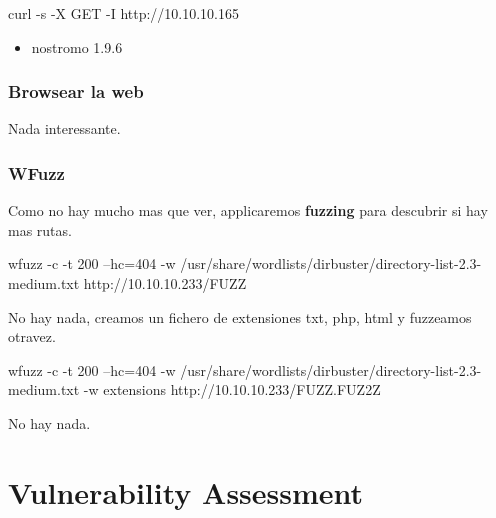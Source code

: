 \documentclass{assets/ipesethesis}
\newenvironment{Shaded}{\begin{snugshade}}{\end{snugshade}}
\newcommand{\ExtensionTok}[1]{#1}
\newcommand{\NormalTok}[1]{#1}
\providecommand{\tightlist}{%
  \setlength{\itemsep}{0pt}\setlength{\parskip}{0pt}}
\begin{document}
\begin{Shaded}
\begin{Highlighting}[]
\ExtensionTok{curl}\NormalTok{ -s -X GET -I http://10.10.10.165}
\end{Highlighting}
\end{Shaded}

\begin{itemize}
\tightlist
\item
  nostromo 1.9.6
\end{itemize}

\hypertarget{browsear-la-web-1}{%
\subsubsection*{Browsear la web}\label{browsear-la-web-1}}

Nada interessante.

\hypertarget{wfuzz-1}{%
\subsubsection*{WFuzz}\label{wfuzz-1}}

Como no hay mucho mas que ver, applicaremos \textbf{fuzzing} para descubrir si hay mas rutas.

\begin{Shaded}
\begin{Highlighting}[]
\ExtensionTok{wfuzz}\NormalTok{ -c -t 200 --hc=404 -w /usr/share/wordlists/dirbuster/directory-list-2.3-medium.txt http://10.10.10.233/FUZZ}
\end{Highlighting}
\end{Shaded}

No hay nada, creamos un fichero de extensiones txt, php, html y fuzzeamos otravez.

\begin{Shaded}
\begin{Highlighting}[]
\ExtensionTok{wfuzz}\NormalTok{ -c -t 200 --hc=404 -w /usr/share/wordlists/dirbuster/directory-list-2.3-medium.txt -w extensions http://10.10.10.233/FUZZ.FUZ2Z}
\end{Highlighting}
\end{Shaded}

No hay nada.

\hypertarget{vulnerability-assessment-1}{%
\section*{Vulnerability Assessment}\label{vulnerability-assessment-1}}
\end{document}
